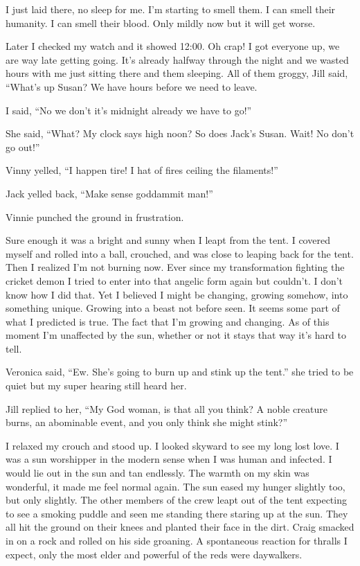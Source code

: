 I just laid there, no sleep for me. I'm starting to smell them. I can smell their humanity. I can smell their blood. Only mildly now but it will get worse.

Later I checked my watch and it showed 12:00. Oh crap! I got everyone up, we are way late getting going. It's already halfway through the night and we wasted hours with me just sitting there and them sleeping. All of them groggy, Jill said, ``What's up Susan? We have hours before we need to leave.

I said, ``No we don't it's midnight already we have to go!''

She said, ``What? My clock says high noon? So does Jack's Susan. Wait! No don't go out!''

Vinny yelled, ``I happen tire! I hat of fires ceiling the filaments!''

Jack yelled back, ``Make sense goddammit man!''

Vinnie punched the ground in frustration.

Sure enough it was a bright and sunny when I leapt from the tent. I covered myself and rolled into a ball, crouched, and was close to leaping back for the tent. Then I realized I'm not burning now. Ever since my transformation fighting the cricket demon I tried to enter into that angelic form again but couldn't. I don't know how I did that. Yet I believed I might be changing, growing somehow, into something unique. Growing into a beast not before seen. It seems some part of what I predicted is true. The fact that I'm growing and changing. As of this moment I'm unaffected by the sun, whether or not it stays that way it's hard to tell.

Veronica said, ``Ew. She's going to burn up and stink up the tent.'' she tried to be quiet but my super hearing still heard her.

Jill replied to her, ``My God woman, is that all you think? A noble creature burns, an abominable event, and you only think she might stink?''

I relaxed my crouch and stood up. I looked skyward to see my long lost love. I was a sun worshipper in the  modern sense when I was human and infected. I would lie out in the sun and tan endlessly. The warmth on my skin was wonderful, it made me feel normal again. The sun eased my hunger slightly too, but only slightly. The other members of the crew leapt out of the tent expecting to see a smoking puddle and seen me standing there staring up at the sun. They all hit the ground on their knees and planted their face in the dirt. Craig smacked in on a rock and rolled on his side groaning. A spontaneous reaction for thralls I expect, only the most elder and powerful of the reds were daywalkers.

